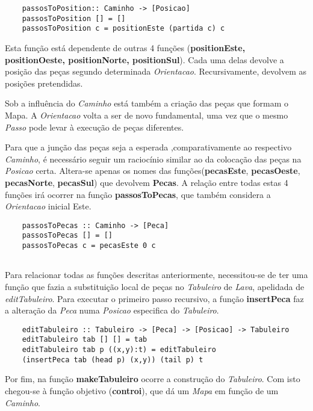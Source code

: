 \documentclass[a4paper]{report} %
\begin{document}
\begin{verbatim}
    passosToPosition:: Caminho -> [Posicao]
    passosToPosition [] = []
    passosToPosition c = positionEste (partida c) c

\end{verbatim}

Esta função está dependente de  outras 4 funções (\textbf{positionEste, positionOeste, positionNorte, positionSul}). Cada uma delas devolve a posição das peças segundo determinada \emph{Orientacao}. Recursivamente, devolvem as posições pretendidas.

Sob a influência do \emph{Caminho} está também a criação das peças que formam o Mapa. A \emph{Orientacao} volta a ser de novo fundamental, uma vez que o mesmo \emph{Passo} pode levar à execução de peças diferentes.

Para que a junção das peças seja a esperada ,comparativamente ao respectivo \emph{Caminho}, é necessário seguir um raciocínio similar ao da colocação das peças na \emph{Posicao} certa. Altera-se apenas os nomes das funções(\textbf{pecasEste}, \textbf{pecasOeste}, \textbf{pecasNorte}, \textbf{pecasSul}) que devolvem \textbf{Pecas}. A relação entre todas estas 4 funções irá ocorrer na função \textbf{passosToPecas}, que também considera a \emph{Orientacao} inicial Este.

\begin{verbatim}
    passosToPecas :: Caminho -> [Peca]
    passosToPecas [] = []
    passosToPecas c = pecasEste 0 c
 
\end{verbatim}

Para relacionar todas as funções descritas anteriormente, necessitou-se de ter uma função que fazia a substituição local de peças no \emph{Tabuleiro} de \emph{Lava}, apelidada de \emph{editTabuleiro}. Para executar o primeiro passo recursivo, a função \textbf{insertPeca} faz a alteração da \emph{Peca} numa \emph{Posicao} especifica do \emph{Tabuleiro}.

\begin{verbatim}
    editTabuleiro :: Tabuleiro -> [Peca] -> [Posicao] -> Tabuleiro
    editTabuleiro tab [] [] = tab
    editTabuleiro tab p ((x,y):t) = editTabuleiro 
    (insertPeca tab (head p) (x,y)) (tail p) t
\end{verbatim}

Por fim, na função \textbf{makeTabuleiro} ocorre a construção do \emph{Tabuleiro}. Com isto chegou-se à função objetivo (\textbf{controi}), que dá um \emph{Mapa} em função de um \emph{Caminho}.
\end{document}

